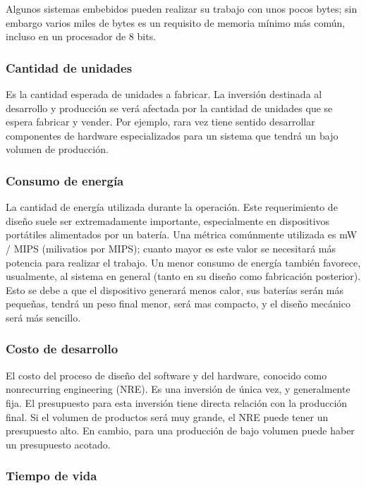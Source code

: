 \documentclass[output=paper, 
colorlinks,
citecolor=brown,
newtxmath
]{langscibook}
\begin{document}
Algunos sistemas embebidos pueden realizar su trabajo
con unos pocos bytes; sin embargo varios miles de bytes es un requisito de
memoria mínimo más común, incluso en un procesador de 8 bits.


\subsubsection *{Cantidad de unidades}

Es la cantidad esperada de unidades a fabricar. 
La inversión destinada al desarrollo y producción se verá afectada 
por la cantidad de unidades que se espera fabricar y vender.
Por ejemplo, rara vez tiene sentido desarrollar componentes de 
hardware especializados para un sistema que tendrá un bajo volumen de producción.


\subsubsection *{Consumo de energía}

La cantidad de energía utilizada durante la operación. 
Este requerimiento de diseño suele ser extremadamente importante, 
especialmente en dispositivos portátiles alimentados por un batería. 
Una métrica comúnmente utilizada es mW / MIPS (milivatios por MIPS); 
cuanto mayor es este valor se necesitará más potencia para realizar el trabajo. 
Un menor consumo de energía también favorece, usualmente,
al sistema en general (tanto en su diseño como fabricación posterior). Esto
se debe a que el dispositivo generará menos calor, sus
baterías serán más pequeñas, tendrá un peso final menor, 
será mas compacto, y el diseño mecánico será más sencillo.


\subsubsection *{Costo de desarrollo}

El costo del proceso de diseño del software y del hardware, conocido como nonrecurring engineering
(NRE). Es una inversión de única vez, y generalmente fija. El presupuesto para
esta inversión tiene directa relación con la producción final. Si el volumen de productos
será muy grande, el NRE puede tener un presupuesto alto. En cambio, para una producción
de bajo volumen puede haber un presupuesto acotado.


\subsubsection *{Tiempo de vida}
\end{document}
